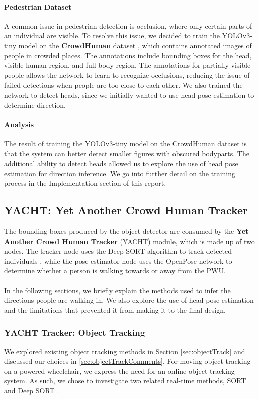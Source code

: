\paragraph{Pedestrian Dataset} A common issue in pedestrian detection is occlusion, where only certain parts of an individual are visible.  To resolve this issue, we decided to train the YOLOv3-tiny model on the \textbf{CrowdHuman} dataset \cite{Shao}, which contains annotated images of people in crowded places. The annotations include bounding boxes for the head, visible human region, and full-body region. The annotations for partially visible people allows the network to learn to recognize occlusions, reducing the issue of failed detections when people are too close to each other. We also trained the network to detect heads, since we initially wanted to use head pose estimation to determine direction.

\paragraph{Analysis}
The result of training the YOLOv3-tiny model on the CrowdHuman dataset is that the system can better detect smaller figures with obscured bodyparts. The additional ability to detect heads allowed us to explore the use of head pose estimation for direction inference. We go into further detail on the training process in the Implementation section of this report.

\subsection{YACHT: Yet Another Crowd Human Tracker}
The bounding boxes produced by the object detector are consumed by the \textbf{Yet Another Crowd Human Tracker} (YACHT) module, which is made up of two nodes. The tracker node uses the Deep SORT algorithm to track detected individuals \cite{Wojke2018}, while the pose estimator node uses the OpenPose \cite{Cao2017} network to determine whether a person is walking towards or away from the PWU.

\paragraph{}In the following sections, we briefly explain the methods used to infer the directions people are walking in. We also explore the use of head pose estimation and the limitations that prevented it from making it to the final design.

\subsubsection{YACHT Tracker: Object Tracking} \label{sec:YACHT}
We explored existing object tracking methods in Section \ref{sec:objectTrack} and discussed our choices in \ref{sec:objectTrackComments}. For moving object tracking on a powered wheelchair, we express the need for an online object tracking system. As such, we chose to investigate two related real-time methods, SORT \cite{Bewley2016} and Deep SORT \cite{Wojke2018}.

